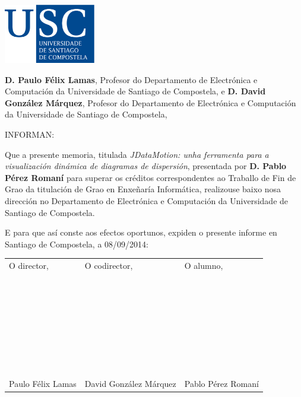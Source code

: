 \pagestyle{plain}
\includegraphics[width=4cm]{figuras/logo_usc.eps}

\vspace{1cm}
{\bf D. Paulo Félix Lamas}, Profesor do Departamento de Electrónica e Computación da Universidade de Santiago de Compostela, e {\bf D. David González Márquez}, Profesor do Departamento de Electrónica e Computación da Universidade de Santiago de Compostela,

\vspace{1cm}
INFORMAN:

\vspace{1cm}
Que a presente memoria, titulada {\it JDataMotion: unha ferramenta para a visualización dinámica de diagramas de dispersión}, presentada por {\bf D. Pablo Pérez Romaní} para superar os créditos correspondentes ao Traballo de Fin de Grao da titulación de Grao en Enxeñaría Informática, realizouse baixo nosa dirección no Departamento de Electrónica e Computación da Universidade de Santiago de Compostela.

\vspace{1cm}
E para que así conste aos efectos oportunos, expiden o presente informe en Santiago de Compostela, a 08/09/2014:

\vspace{2cm}
\begin{tabular}{lll}
O director, & O codirector, & O alumno, \\
~ \\
~ \\
~ \\
~ \\
~ \\
~ \\
~ \\
Paulo Félix Lamas & David González Márquez & Pablo Pérez Romaní
\end{tabular}

